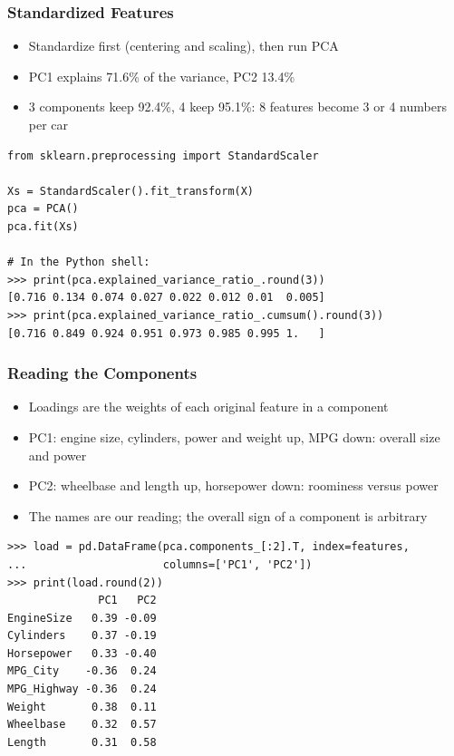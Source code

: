 \begin{frame}[fragile]\frametitle{Standardized Features}
\begin{itemize}
\item Standardize first (centering and scaling), then run PCA
\item PC1 explains 71.6\% of the variance, PC2 13.4\%
\item 3 components keep 92.4\%, 4 keep 95.1\%: 8 features become 3 or 4 numbers per car
\end{itemize}
\begin{lstlisting}
from sklearn.preprocessing import StandardScaler

Xs = StandardScaler().fit_transform(X)
pca = PCA()
pca.fit(Xs)

# In the Python shell:
>>> print(pca.explained_variance_ratio_.round(3))
[0.716 0.134 0.074 0.027 0.022 0.012 0.01  0.005]
>>> print(pca.explained_variance_ratio_.cumsum().round(3))
[0.716 0.849 0.924 0.951 0.973 0.985 0.995 1.   ]
\end{lstlisting}
\end{frame}

\begin{frame}[fragile]\frametitle{Reading the Components}
\begin{itemize}
\item Loadings are the weights of each original feature in a component
\item PC1: engine size, cylinders, power and weight up, MPG down: overall size and power
\item PC2: wheelbase and length up, horsepower down: roominess versus power
\item The names are our reading; the overall sign of a component is arbitrary
\end{itemize}
\begin{lstlisting}
>>> load = pd.DataFrame(pca.components_[:2].T, index=features,
...                     columns=['PC1', 'PC2'])
>>> print(load.round(2))
              PC1   PC2
EngineSize   0.39 -0.09
Cylinders    0.37 -0.19
Horsepower   0.33 -0.40
MPG_City    -0.36  0.24
MPG_Highway -0.36  0.24
Weight       0.38  0.11
Wheelbase    0.32  0.57
Length       0.31  0.58
\end{lstlisting}
\end{frame}

